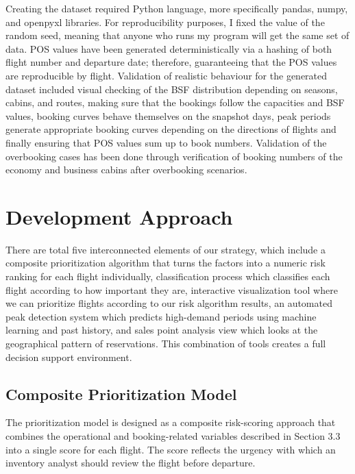 Creating the dataset required Python language, more specifically pandas, numpy, and openpyxl libraries. For reproducibility purposes, I fixed the value of the random seed, meaning that anyone who runs my program will get the same set of data. POS values have been generated deterministically via a hashing of both flight number and departure date; therefore, guaranteeing that the POS values are reproducible by flight. Validation of realistic behaviour for the generated dataset included visual checking of the BSF distribution depending on seasons, cabins, and routes, making sure that the bookings follow the capacities and BSF values, booking curves behave themselves on the snapshot days, peak periods generate appropriate booking curves depending on the directions of flights and finally ensuring that POS values sum up to book numbers. Validation of the overbooking cases has been done through verification of booking numbers of the economy and business cabins after overbooking scenarios.

\section{Development Approach}

There are total five interconnected elements of our strategy, which include a composite prioritization algorithm that turns the factors into a numeric risk ranking for each flight individually, classification process which classifies each flight according to how important they are, interactive visualization tool where we can prioritize flights according to our risk algorithm results, an automated peak detection system which predicts high-demand periods using machine learning and past history, and sales point analysis view which looks at the geographical pattern of reservations. This combination of tools creates a full decision support environment.

\subsection{Composite Prioritization Model}
\label{subsec:composite}

The prioritization model is designed as a composite risk-scoring approach that combines the operational and booking-related variables described in Section 3.3 into a single score for each flight. The score reflects the urgency with which an inventory analyst should review the flight before departure.

